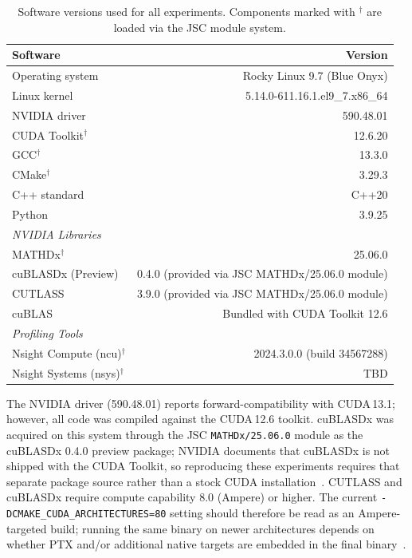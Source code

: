 \begin{table}[H]
\centering
\caption{Software versions used for all experiments. Components marked with ${}^{\dagger}$ are loaded via the JSC module system.}
\label{tab:repro-software}
\begin{tabularx}{\textwidth}{X r}
\toprule
Software & Version \\
\midrule
Operating system & Rocky Linux 9.7 (Blue Onyx) \\
Linux kernel & 5.14.0-611.16.1.el9\_7.x86\_64 \\
NVIDIA driver & 590.48.01 \\
CUDA Toolkit${}^{\dagger}$ & 12.6.20 \\
GCC${}^{\dagger}$ & 13.3.0 \\
CMake${}^{\dagger}$ & 3.29.3 \\
C++ standard & C++20 \\
Python & 3.9.25 \\
\midrule
\multicolumn{2}{l}{\textit{NVIDIA Libraries}} \\
\midrule
MATHDx${}^{\dagger}$ & 25.06.0 \\
cuBLASDx (Preview) & 0.4.0 (provided via JSC MATHDx/25.06.0 module) \\
CUTLASS & 3.9.0 (provided via JSC MATHDx/25.06.0 module) \\
cuBLAS & Bundled with CUDA Toolkit 12.6 \\
\midrule
\multicolumn{2}{l}{\textit{Profiling Tools}} \\
\midrule
Nsight Compute (ncu)${}^{\dagger}$ & 2024.3.0.0 (build 34567288) \\
Nsight Systems (nsys)${}^{\dagger}$ & TBD \\
\bottomrule
\end{tabularx}
\end{table}

The NVIDIA driver (590.48.01) reports forward-compatibility with CUDA\,13.1;
however, all code was compiled against the CUDA\,12.6 toolkit. cuBLASDx was
acquired on this system through the JSC \texttt{MATHDx/25.06.0} module as the
cuBLASDx 0.4.0 preview package; NVIDIA documents that cuBLASDx is not shipped
with the CUDA Toolkit, so reproducing these experiments requires that separate
package source rather than a stock CUDA installation~\cite{cublas,nvidia-cublasdx-downloads}. CUTLASS and cuBLASDx require compute capability 8.0 (Ampere)
or higher. The current \texttt{-DCMAKE\_CUDA\_ARCHITECTURES=80} setting should
therefore be read as an Ampere-targeted build; running the same binary on newer
architectures depends on whether PTX and/or additional native targets are
embedded in the final binary~\cite{nvidia-ada-compat-guide}.

